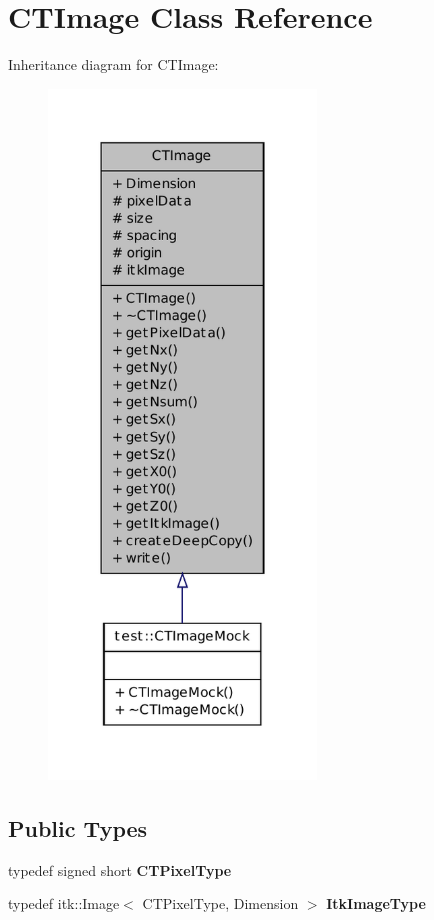 \hypertarget{class_c_t_image}{
\section{CTImage Class Reference}
\label{class_c_t_image}
}


Inheritance diagram for CTImage:
\nopagebreak
\begin{figure}[H]
\begin{center}
\leavevmode
\includegraphics[width=202pt]{class_c_t_image__inherit__graph}
\end{center}
\end{figure}
\subsection*{Public Types}
\begin{DoxyCompactItemize}
\item 
\hypertarget{class_c_t_image_a2408331e8b73ddbffdb8130ddb221d1c}{
typedef signed short {\bfseries CTPixelType}}
\label{class_c_t_image_a2408331e8b73ddbffdb8130ddb221d1c}

\item 
\hypertarget{class_c_t_image_add235b8efbef09ed661c3bfe771812ad}{
typedef itk::Image$<$ CTPixelType, Dimension $>$ {\bfseries ItkImageType}}
\label{class_c_t_image_add235b8efbef09ed661c3bfe771812ad}

\end{DoxyCompactItemize}
